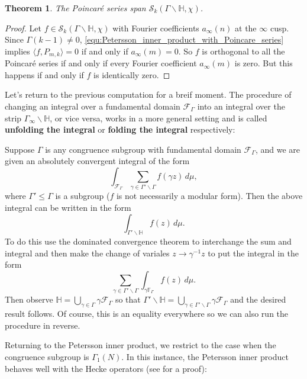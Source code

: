 \documentclass[12pt]{book}
\newtheorem{theorem}{Theorem}[section]
\theoremstyle{definition}\newframedtheorem{method}{Method}
\newcommand{\mc}{\mathcal}
\newcommand{\F}{\mathbb{F}}
\renewcommand{\H}{\mathbb{H}}
\newcommand{\g}{\gamma}
\newcommand{\G}{\Gamma}
\newcommand{\<}{\langle}
\renewcommand{\>}{\rangle}
\newcommand{\GH}{\G\backslash\H}
\begin{document}
      \begin{theorem}
        The Poincar\'e series span $\mc{S}_{k}(\GH,\chi)$.
      \end{theorem}
      \begin{proof}
        Let $f \in \mc{S}_{k}(\GH,\chi)$ with Fourier coefficients $a_{\infty}(n)$ at the $\infty$ cusp. Since $\G(k-1) \neq 0$, \cref{equ:Petersson_inner_product_with_Poincare_series} implies $\<f,P_{m,k}\> = 0$ if and only if $a_{\infty}(m) = 0$. So $f$ is orthogonal to all the Poincar\'e series if and only if every Fourier coefficient $a_{\infty}(m)$ is zero. But this happens if and only if $f$ is identically zero.
      \end{proof}

      Let's return to the previous computation for a breif moment. The procedure of changing an integral over a fundamental domain $\mc{F}_{\G}$ into an integral over the strip $\G_{\infty}\backslash\H$, or vice versa, works in a more general setting and is called \textbf{unfolding the integral} or \textbf{folding the integral} respectively:

      \begin{method}
        Suppose $\G$ is any congruence subgroup with fundamental domain $\mc{F}_{\G}$, and we are given an absolutely convergent integral of the form
        \[
          \int_{\mc{F}_{\G}}\sum_{\g \in \G'\backslash\G}f(\g z)\,d\mu,
        \]
        where $\G' \le \G$ is a subgroup ($f$ is not necessarily a modular form). Then the above integral can be written in the form
        \[
          \int_{\G'\backslash\H}f(z)\,d\mu.
        \]
        To do this use the dominated convergence theorem to interchange the sum and integral and then make the change of variales $z \to \g^{-1}z$ to put the integral in the form
        \[
          \sum_{\g \in \G'\backslash\G}\int_{\g\F_{\G}}f(z)\,d\mu.
        \]
        Then observe $\H = \bigcup_{\g \in \G}\g\mc{F}_{\G}$ so that $\G'\backslash\H = \bigcup_{\g \in \G'\backslash\G}\g\mc{F}_{\G}$ and the desired result follows. Of course, this is an equality everywhere so we can also run the procedure in reverse.
      \end{method}

      Returning to the Petersson inner product, we restrict to the case when the congruence subgroup is $\G_{1}(N)$. In this instance, the Petersson inner product behaves well with the Hecke operators (see \cite{lang2012introduction} for a proof):
\end{document}
